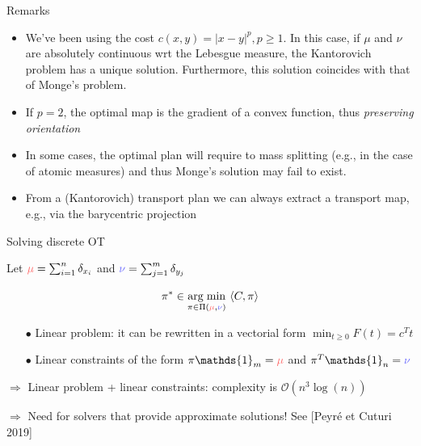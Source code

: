 \documentclass[pdf,aspectratio=169,10pt]{beamer}
\begin{document}
\begin{frame}{Remarks} 
    \begin{itemize}
        \item We've been using the cost $c(x,y) = |x-y|^p, p\geq 1$. In this case, if $\mu$ and $\nu$ are absolutely continuous wrt the Lebesgue measure, the Kantorovich problem has a unique solution. Furthermore, this solution coincides with that of Monge's problem.
        \item If $p=2$, the optimal map is the gradient of a convex function, thus \emph{preserving orientation}
        \item In some cases, the optimal plan will require to mass splitting (e.g., in the case of atomic measures) and thus Monge's solution may fail to exist. 
        \item From a (Kantorovich) transport plan we can always extract a transport map, e.g., via the barycentric projection
    \end{itemize}
\end{frame}






\begin{frame}{Solving discrete OT}

Let $\er{\mu}=\sum_{i=1}^n\delta_{x_i}$ and $\eb{\nu}=\sum_{j=1}^m\delta_{y_j}$
\begin{block}{}
$$\pi^\ast \in \underset{\pi\in\Pi(\er{\mu},\eb{\nu})}{\argmin} \ \langle C, \pi \rangle$$
\end{block}

{\vspace{0.3cm}\begin{itemize}
\item[$\bullet$] Linear problem: it can be rewritten in a vectorial form $\min_{t\geq 0} F(t) = c^Tt$
\item[$\bullet$] Linear constraints of the form $\pi\mathds{1}_m =\er{\mu}$ and $\pi^T\mathds{1}_n=\eb{\nu}$
\end{itemize}
\vspace{0.1cm}$\Longrightarrow$ Linear problem + linear constraints: complexity is $\mathcal{O}(n^3\log(n))$}

{\vspace{0.3cm}$\Longrightarrow$ Need for solvers that provide approximate solutions! See [Peyré et Cuturi 2019]}
\end{frame}
\end{document}
